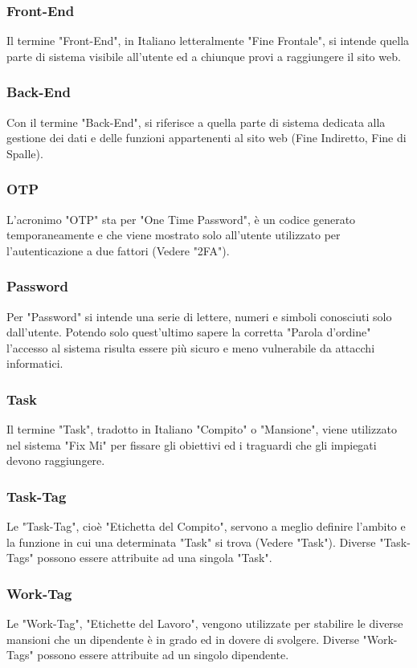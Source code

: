 \documentclass{report}
\begin{document}
\subsubsection*{Front-End}
Il termine "Front-End", in Italiano letteralmente "Fine Frontale", si intende quella parte di sistema visibile all'utente ed a chiunque provi a raggiungere il sito web.
\subsubsection*{Back-End}
Con il termine "Back-End", si riferisce a quella parte di sistema dedicata alla gestione dei dati e delle funzioni appartenenti al sito web (Fine Indiretto, Fine di Spalle).
\subsubsection*{OTP}
L'acronimo "OTP" sta per "One Time Password", è un codice generato temporaneamente e che viene mostrato solo all'utente  utilizzato per l'autenticazione a due fattori (Vedere "2FA").
\subsubsection*{Password}
Per "Password" si intende una serie di lettere, numeri e simboli conosciuti solo dall'utente. Potendo solo quest'ultimo sapere la corretta "Parola d'ordine" l'accesso al sistema risulta essere più sicuro e meno vulnerabile da attacchi informatici.
\subsubsection*{Task}
Il termine "Task", tradotto in Italiano "Compito" o "Mansione", viene utilizzato nel sistema "Fix Mi" per fissare gli obiettivi ed i traguardi che gli impiegati devono raggiungere.
\subsubsection*{Task-Tag}
Le "Task-Tag", cioè "Etichetta del Compito", servono a meglio definire l'ambito e la funzione in cui una determinata "Task" si trova (Vedere "Task"). Diverse "Task-Tags" possono essere attribuite ad una singola "Task".
\subsubsection*{Work-Tag}
Le "Work-Tag", "Etichette del Lavoro", vengono utilizzate per stabilire le diverse mansioni che un dipendente è in grado ed in dovere di svolgere. Diverse "Work-Tags" possono essere attribuite ad un singolo dipendente.
\end{document}
